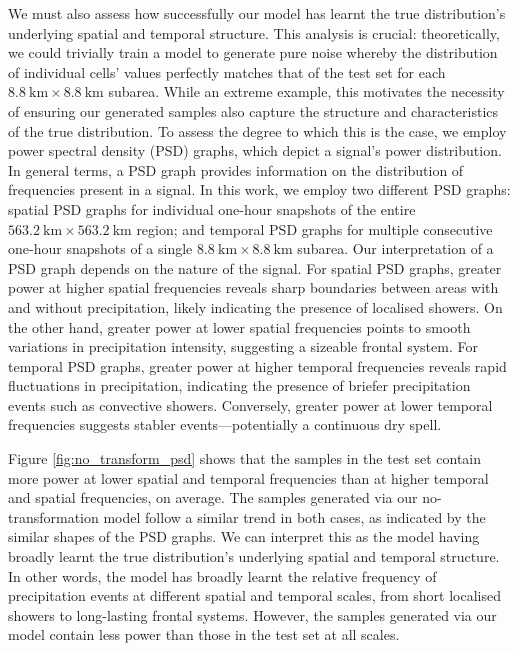 \documentclass[ oneside,%
                    author={George Herbert},
                    degree={MSci},
                     title={Diffusion Models for Time-Evolving Precipitation Fields},
                  subtitle={}]{dissertation}
\begin{document}
We must also assess how successfully our model has learnt the true distribution's underlying spatial and temporal structure. This analysis is crucial: theoretically, we could trivially train a model to generate pure noise whereby the distribution of individual cells' values perfectly matches that of the test set for each $8.8\ \mathrm{km}\times 8.8\ \mathrm{km}$ subarea. While an extreme example, this motivates the necessity of ensuring our generated samples also capture the structure and characteristics of the true distribution. To assess the degree to which this is the case, we employ power spectral density (PSD) graphs, which depict a signal's power distribution. In general terms, a PSD graph provides information on the distribution of frequencies present in a signal. In this work, we employ two different PSD graphs: spatial PSD graphs for individual one-hour snapshots of the entire $563.2\ \mathrm{km}\times 563.2\ \mathrm{km}$ region; and temporal PSD graphs for multiple consecutive one-hour snapshots of a single $8.8\ \mathrm{km}\times 8.8\ \mathrm{km}$ subarea. Our interpretation of a PSD graph depends on the nature of the signal. For spatial PSD graphs, greater power at higher spatial frequencies reveals sharp boundaries between areas with and without precipitation, likely indicating the presence of localised showers. On the other hand, greater power at lower spatial frequencies points to smooth variations in precipitation intensity, suggesting a sizeable frontal system. For temporal PSD graphs, greater power at higher temporal frequencies reveals rapid fluctuations in precipitation, indicating the presence of briefer precipitation events such as convective showers. Conversely, greater power at lower temporal frequencies suggests stabler events---potentially a continuous dry spell. 

Figure \ref{fig:no_transform_psd} shows that the samples in the test set contain more power at lower spatial and temporal frequencies than at higher temporal and spatial frequencies, on average. The samples generated via our no-transformation model follow a similar trend in both cases, as indicated by the similar shapes of the PSD graphs. We can interpret this as the model having broadly learnt the true distribution's underlying spatial and temporal structure. In other words, the model has broadly learnt the relative frequency of precipitation events at different spatial and temporal scales, from short localised showers to long-lasting frontal systems. However, the samples generated via our model contain less power than those in the test set at all scales.
\end{document}
